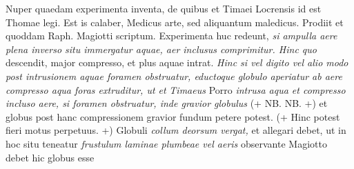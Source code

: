 \pend 
\count{}
\count{}
\pstart {} Nuper quaedam experimenta inventa, de quibus et Timaei Locrensis id est
Thomae \protect{} legi. Est is calaber\protect{}, Medicus arte, sed aliquantum maledicus. Prodiit et quoddam Raph. Magiotti\protect{} scriptum. Experimenta huc redeunt, 
\textit{si ampulla aere plena inverso situ immergatur aquae,
aer inclusus comprimitur.
Hinc quo } descendit, major compresso, et plus aquae intrat. \textit{Hinc si vel digito vel alio modo post intrusionem aquae foramen obstruatur, eductoque globulo aperiatur ab aere compresso aqua foras extruditur, ut et}
\textit{Timaeus } Porro \textit{intrusa aqua et compresso incluso aere, si foramen obstruatur, inde gravior globulus } (+ NB. NB. +) et globus post hanc compressionem gravior fundum petere potest. (+ Hinc potest fieri motus perpetuus. +) Globuli \textit{collum  deorsum vergat,} et allegari debet, ut in hoc situ teneatur \textit{frustulum laminae plumbeae\protect{} vel aeris} observante Magiotto\protect{}
debet hic globus esse 
